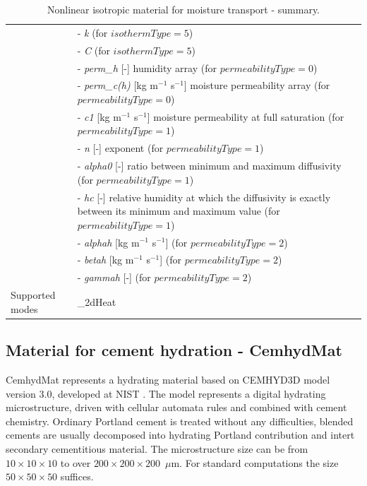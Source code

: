 \documentclass[a4paper]{article}
\newcommand{\param}[1]{{\it #1}}
\begin{document}
\begin{table}[!htb]
\begin{tabular}{|l|p{9cm}|}
&- \param{k} (for $isothermType=5$) \\
&- \param{C} (for $isothermType=5$) \\
&- \param{perm\_h} [-] humidity array (for $permeabilityType=0$) \\
&- \param{perm\_c(h)} [kg m$^{-1}$ s$^{-1}$] moisture permeability
array (for $permeabilityType=0$) \\
&- \param{c1} [kg m$^{-1}$ s$^{-1}$] moisture permeability at full
saturation (for $permeabilityType=1$) \\
&- \param{n} [-] exponent (for $permeabilityType=1$) \\
&- \param{alpha0} [-] ratio between minimum and maximum diffusivity
(for $permeabilityType=1$) \\
&- \param{hc} [-] relative humidity at which the diffusivity is exactly
between its minimum and maximum value (for $permeabilityType=1$) \\
&- \param{alphah} [kg m$^{-1}$ s$^{-1}$] (for $permeabilityType=2$) \\
&- \param{betah} [kg m$^{-1}$ s$^{-1}$] (for $permeabilityType=2$) \\
&- \param{gammah} [-] (for $permeabilityType=2$) \\

Supported modes& \_2dHeat \\
\hline
\end{tabular}
\caption{Nonlinear isotropic material for moisture transport - summary.}
\label{NlIsoMoistureMat}
\end{table}



\subsection{Material for cement hydration - CemhydMat}
\label{Cemhyd}
CemhydMat represents a hydrating material based on CEMHYD3D model version 3.0,
developed at NIST \cite{NISTIR7232}. The model represents a digital hydrating
microstructure, driven with cellular automata rules and combined with cement
chemistry. Ordinary Portland cement is treated without any difficulties, blended
cements are usually decomposed into hydrating Portland contribution and intert
secondary cementitious material. The microstructure size can be from
$10\times10\times10$ to over $200\times200\times200$~$\mu$m. For standard
computations the size $50\times50\times50$ suffices.
\end{document}
